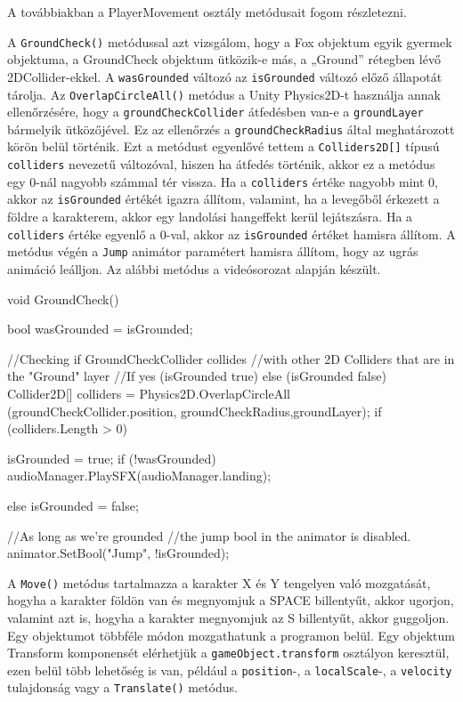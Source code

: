 A továbbiakban a PlayerMovement osztály metódusait fogom részletezni.

A \texttt{GroundCheck()} metódussal azt vizsgálom, hogy a Fox objektum egyik gyermek objektuma, a GroundCheck  objektum ütközik-e más, a „Ground” rétegben lévő 2DCollider-ekkel. A \texttt{wasGrounded} változó az \texttt{isGrounded} változó előző állapotát tárolja. Az \texttt{OverlapCircleAll()} metódus a Unity Physics2D-t használja annak ellenőrzésére, hogy a \texttt{groundCheckCollider} átfedésben van-e a \texttt{groundLayer} bármelyik ütközőjével. Ez az ellenőrzés a \texttt{groundCheckRadius} által meghatározott körön belül történik. Ezt a metódust egyenlővé tettem a \texttt{Colliders2D[]} típusú \texttt{colliders} nevezetű változóval, hiszen ha átfedés történik, akkor ez a metódus egy 0-nál nagyobb számmal tér vissza. Ha a \texttt{colliders} értéke nagyobb mint 0, akkor az \texttt{isGrounded} értékét igazra állítom, valamint, ha a levegőből érkezett a földre a karakterem, akkor egy landolási hangeffekt kerül lejátszásra. Ha a \texttt{colliders} értéke egyenlő a 0-val, akkor az \texttt{isGrounded} értéket hamisra állítom. A metódus végén a \texttt{Jump} animátor paramétert hamisra állítom, hogy az ugrás animáció leálljon. Az alábbi metódus a \cite{youtubeplaylist} videósorozat alapján készült.

\begin{java}
void GroundCheck()
{
    bool wasGrounded = isGrounded;

    //Checking if GroundCheckCollider collides
    //with other 2D Colliders that are in the "Ground" layer
    //If yes (isGrounded true) else (isGrounded false)
    Collider2D[] colliders = 
        Physics2D.OverlapCircleAll
        (groundCheckCollider.position, 
        groundCheckRadius,groundLayer);
    if (colliders.Length > 0)
    {
        isGrounded = true;
        if (!wasGrounded)
        {
            audioManager.PlaySFX(audioManager.landing);
        }

    }
    else
    {
        isGrounded = false;
    }    

    //As long as we're grounded
    //the jump bool in the animator is disabled.
    animator.SetBool("Jump", !isGrounded);
}
\end{java}

A \texttt{Move()} metódus tartalmazza a karakter X és Y tengelyen való mozgatását, hogyha a karakter földön van és megnyomjuk a SPACE billentyűt, akkor ugorjon, valamint azt is, hogyha a karakter megnyomjuk az S billentyűt, akkor guggoljon. Egy objektumot többféle módon mozgathatunk a programon belül. Egy objektum Transform komponensét elérhetjük a \texttt{gameObject.transform} osztályon keresztül, ezen belül több lehetőség is van, például a \texttt{position}-, a \texttt{localScale}-, a \texttt{velocity} tulajdonság vagy a \texttt{Translate()} metódus.

